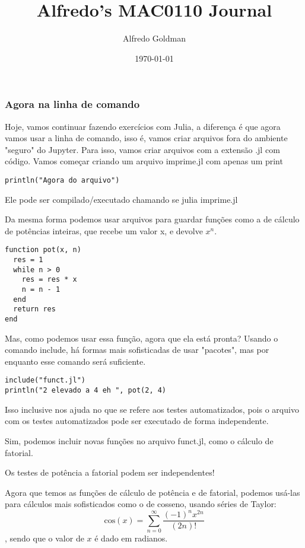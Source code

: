 \documentclass[a4paper]{article}
\author{Alfredo Goldman}
\date{\today}
\title{Alfredo's MAC0110 Journal}
\begin{document}
\maketitle

\subsubsection{Agora na linha de comando}
\label{sec:org0684843}
  Hoje, vamos continuar fazendo exercícios com Julia, a diferença é que agora vamos usar
a linha de comando, isso é, vamos criar arquivos fora do ambiente "seguro" do Jupyter.
Para isso, vamos criar arquivos com a extensão .jl com código. Vamos começar criando um
arquivo imprime.jl com apenas um print

\lstset{language=ein-julia,label= ,caption= ,captionpos=b,numbers=none}
\begin{lstlisting}
println("Agora do arquivo")
\end{lstlisting}

Ele pode ser compilado/executado chamando se julia imprime.jl

Da mesma forma podemos usar arquivos para guardar funções como a
de cálculo de potências inteiras, que recebe um valor x, e devolve \(x^ n\).

\lstset{language=ein-julia,label= ,caption= ,captionpos=b,numbers=none}
\begin{lstlisting}
function pot(x, n)
  res = 1
  while n > 0
    res = res * x
    n = n - 1
  end
  return res
end
\end{lstlisting}

 Mas, como podemos usar essa função, agora que ela está pronta? Usando o comando
include, há formas mais sofisticadas de usar "pacotes", mas por enquanto esse comando
será suficiente.

\lstset{language=ein-julia,label= ,caption= ,captionpos=b,numbers=none}
\begin{lstlisting}
include("funct.jl")
println("2 elevado a 4 eh ", pot(2, 4)
\end{lstlisting}

Isso inclusive nos ajuda no que se refere aos testes automatizados, pois o
arquivo com os testes automatizados pode ser executado de forma independente.

Sim, podemos incluir novas funções no arquivo funct.jl, como o cálculo de
fatorial.

Os testes de potência a fatorial podem ser independentes!

Agora que temos as funções de cálculo de potência e de fatorial, podemos usá-las
para cálculos mais sofisticados como o de cosseno, usando séries de Taylor:
\[ \mbox{cos}(x) = \sum_{n = 0}^{\infty} \frac{(-1)^n x^{2n}}{(2n)!} \], sendo que o valor de \(x\) é
dado em radianos.
\end{document}
